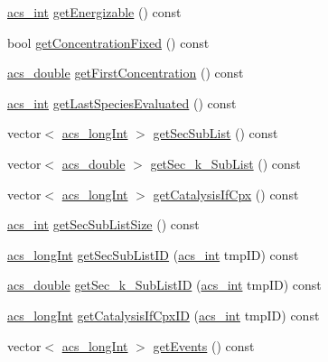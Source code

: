 \begin{DoxyCompactItemize}
\item 
\hyperlink{a00050_a8d277355641a098190360234e2ebde35}{acs\+\_\+int} \hyperlink{a00021_ad234e523f16507008b64f2d872d9792f}{get\+Energizable} () const 
\item 
bool \hyperlink{a00021_aa2b24de5a97f1e06d359ab5b63817d98}{get\+Concentration\+Fixed} () const 
\item 
\hyperlink{a00050_ab776853a005fcbf56af0424a2a4dd607}{acs\+\_\+double} \hyperlink{a00021_a6773ef96109c27ddd4afa78b87b2fcd3}{get\+First\+Concentration} () const 
\item 
\hyperlink{a00050_a8d277355641a098190360234e2ebde35}{acs\+\_\+int} \hyperlink{a00021_ace7de26d4e33dddfa78f2c624cfb3666}{get\+Last\+Species\+Evaluated} () const 
\item 
vector$<$ \hyperlink{a00050_a19319d75f02db4308bc5c0026d98cd85}{acs\+\_\+long\+Int} $>$ \hyperlink{a00021_ada53efcec76e8f241b15fd6c76d4fb79}{get\+Sec\+Sub\+List} () const 
\item 
vector$<$ \hyperlink{a00050_ab776853a005fcbf56af0424a2a4dd607}{acs\+\_\+double} $>$ \hyperlink{a00021_a30f77a52d0c75f02f6b4c269b5cf702d}{get\+Sec\+\_\+k\+\_\+\+Sub\+List} () const 
\item 
vector$<$ \hyperlink{a00050_a19319d75f02db4308bc5c0026d98cd85}{acs\+\_\+long\+Int} $>$ \hyperlink{a00021_aaafd2738231ba916153e24c19e7b3bfc}{get\+Catalysis\+If\+Cpx} () const 
\item 
\hyperlink{a00050_a8d277355641a098190360234e2ebde35}{acs\+\_\+int} \hyperlink{a00021_a984df86838272204e7a8414bbc2a61fb}{get\+Sec\+Sub\+List\+Size} () const 
\item 
\hyperlink{a00050_a19319d75f02db4308bc5c0026d98cd85}{acs\+\_\+long\+Int} \hyperlink{a00021_a214be9ae628e99e47dfd9d72c8c07933}{get\+Sec\+Sub\+List\+I\+D} (\hyperlink{a00050_a8d277355641a098190360234e2ebde35}{acs\+\_\+int} tmp\+I\+D) const 
\item 
\hyperlink{a00050_ab776853a005fcbf56af0424a2a4dd607}{acs\+\_\+double} \hyperlink{a00021_a6c546c89a974434e24f2161867521462}{get\+Sec\+\_\+k\+\_\+\+Sub\+List\+I\+D} (\hyperlink{a00050_a8d277355641a098190360234e2ebde35}{acs\+\_\+int} tmp\+I\+D) const 
\item 
\hyperlink{a00050_a19319d75f02db4308bc5c0026d98cd85}{acs\+\_\+long\+Int} \hyperlink{a00021_aac1880e5779d75ef8c700bee278da15d}{get\+Catalysis\+If\+Cpx\+I\+D} (\hyperlink{a00050_a8d277355641a098190360234e2ebde35}{acs\+\_\+int} tmp\+I\+D) const 
\item 
vector$<$ \hyperlink{a00050_a19319d75f02db4308bc5c0026d98cd85}{acs\+\_\+long\+Int} $>$ \hyperlink{a00021_af261c742c9578875c1001abf191706b7}{get\+Events} () const 

\end{DoxyCompactItemize}
